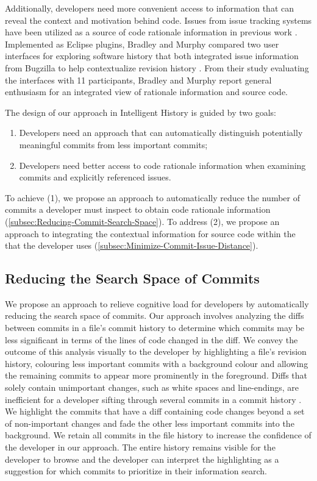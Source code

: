 Additionally, developers need more convenient access
to information that can reveal the context and motivation behind code.
Issues from issue tracking systems have been utilized as a source of
code rationale information in previous work \cite{rastkar_why_2013,moreno_arena_2017,bradley_supporting_2011}.
Implemented as Eclipse  plugins, Bradley and Murphy compared two user interfaces 
for exploring software history that both integrated issue information
from Bugzilla to help contextualize revision history \cite{bradley_supporting_2011}.
From their study evaluating the interfaces with 11 participants, Bradley and Murphy report general enthusiasm for
an integrated view of rationale information and source code.

The design of our approach in Intelligent History is guided by two goals: 

\begin{enumerate}[label={(\arabic*)}]
    \item Developers need an approach that can automatically distinguish potentially meaningful commits from less important commits;
    \item Developers need better access to code rationale information when examining commits and explicitly referenced issues.
\end{enumerate}

To achieve (1), we propose an approach to automatically reduce the number of commits a developer must inspect to obtain code rationale information (\autoref{subsec:Reducing-Commit-Search-Space}).
To address (2), we propose an approach to integrating the contextual information for source code within the  that the developer uses (\autoref{subsec:Minimize-Commit-Issue-Distance}).

\subsection{Reducing the Search Space of Commits}
\label{subsec:Reducing-Commit-Search-Space}

We propose an approach to relieve cognitive load for developers by automatically reducing the search space of commits.
Our approach involves analyzing the diffs between commits in a file's commit history to determine 
which commits may be less significant in terms of the lines of code changed in the diff.
We convey the outcome of this analysis visually to the developer by highlighting a file's revision history, 
colouring less important commits with a background colour and allowing the remaining commits to appear more prominently in the foreground.
Diffs that solely contain unimportant changes, such as white spaces and line-endings, are inefficient 
for a developer sifting through several commits in a commit history \cite{codoban_software_2015}.
We highlight the commits that have a diff containing code changes beyond a set of non-important changes 
and fade the other less important commits into the background.
We retain all commits in the file history to increase the confidence of the developer in our approach.
The entire history remains visible for the developer to browse 
and the developer can interpret the highlighting as a suggestion for which commits to prioritize in their information search.

